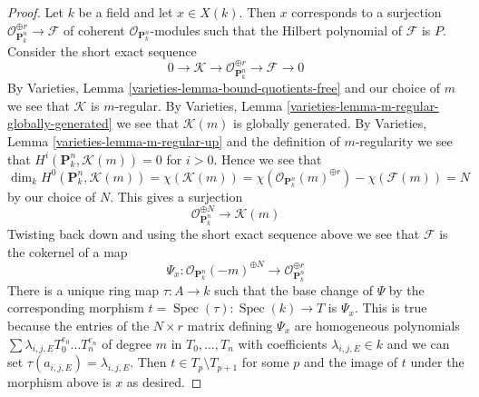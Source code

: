 \documentclass[10pt,a4paper]{amsart}
\theoremstyle{plain}
\theoremstyle{definition}
\theoremstyle{remark}
\numberwithin{equation}{subsection}
\def\Spec{\mathop{\mathrm{Spec}}}
\begin{document}
\begin{proof}
\medskip\noindent
Let $k$ be a field and let $x \in X(k)$. Then $x$ corresponds to
a surjection $\mathcal{O}_{\mathbf{P}^n_k}^{\oplus r} \to \mathcal{F}$
of coherent $\mathcal{O}_{\mathbf{P}^n_k}$-modules
such that the Hilbert polynomial of $\mathcal{F}$ is $P$.
Consider the short exact sequence
$$
0 \to \mathcal{K} \to
\mathcal{O}_{\mathbf{P}^n_k}^{\oplus r} \to
\mathcal{F} \to 0
$$
By Varieties, Lemma \ref{varieties-lemma-bound-quotients-free}
and our choice of $m$ we see that $\mathcal{K}$ is $m$-regular.
By Varieties, Lemma \ref{varieties-lemma-m-regular-globally-generated}
we see that $\mathcal{K}(m)$ is globally generated.
By Varieties, Lemma \ref{varieties-lemma-m-regular-up}
and the definition of $m$-regularity we see that
$H^i(\mathbf{P}^n_k, \mathcal{K}(m)) = 0$ for $i > 0$.
Hence we see that
$$
\dim_k H^0(\mathbf{P}^n_k, \mathcal{K}(m)) =
\chi(\mathcal{K}(m)) =
\chi(\mathcal{O}_{\mathbf{P}^n_k}(m)^{\oplus r}) -
\chi(\mathcal{F}(m)) = N
$$
by our choice of $N$. This gives a surjection
$$
\mathcal{O}_{\mathbf{P}^n_k}^{\oplus N}
\longrightarrow
\mathcal{K}(m)
$$
Twisting back down and using the short exact sequence above
we see that $\mathcal{F}$ is the cokernel of a map
$$
\Psi_x :
\mathcal{O}_{\mathbf{P}^n_k}(-m)^{\oplus N}
\to
\mathcal{O}_{\mathbf{P}^n_k}^{\oplus r}
$$
There is a unique ring map $\tau : A \to k$ such that the base change
of $\Psi$ by the corresponding morphism $t = \Spec(\tau) : \Spec(k) \to T$
is $\Psi_x$. This is true because the entries of the $N \times r$
matrix defining $\Psi_x$ are homogeneous polynomials
$\sum \lambda_{i, j, E} T_0^{e_0} \ldots T_n^{e_n}$
of degree $m$ in $T_0, \ldots, T_n$ with coefficients
$\lambda_{i, j, E} \in k$ and we can set
$\tau(a_{i, j, E}) = \lambda_{i, j, E}$.
Then $t \in T_p \setminus T_{p + 1}$ for some $p$ and
the image of $t$ under the morphism above is $x$ as desired.
\end{proof}
\end{document}
